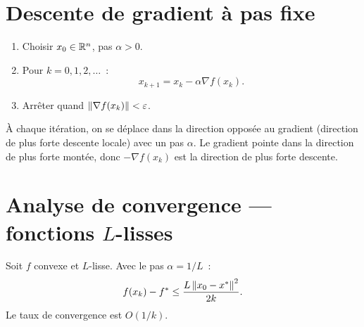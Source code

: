 \section{Descente de gradient \`a pas fixe}

\begin{algorithme}[title=\textbf{Descente de gradient}]
\begin{enumerate}
    \item Choisir $x_0 \in \mathbb{R}^n$, pas $\alpha > 0$.
    \item Pour $k = 0, 1, 2, \ldots$~:
    \[
        x_{k+1} = x_k - \alpha \nabla f(x_k).
    \]
    \item Arr\^eter quand $\left\| \nabla f(x_k) \right\| < \varepsilon$.
\end{enumerate}
\end{algorithme}

\begin{intuition}
\`A chaque it\'eration, on se d\'eplace dans la direction oppos\'ee au gradient
(direction de plus forte descente locale) avec un pas $\alpha$. Le gradient pointe
dans la direction de plus forte mont\'ee, donc $-\nabla f(x_k)$ est la direction
de plus forte descente.
\end{intuition}

\section{Analyse de convergence --- fonctions $L$-lisses}

\begin{theoreme}
\label{thm:conv_lisse}
Soit $f$ convexe et $L$-lisse. Avec le pas $\alpha = 1/L$~:
\[
    f(x_k) - f^* \leq \frac{L\left\| x_0 - x^* \right\|^2}{2k}.
\]
Le taux de convergence est $O(1/k)$.
\end{theoreme}

